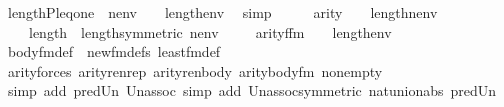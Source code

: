 \begin{isabellebody}
\ {\isachardoublequoteopen}length{\isacharparenleft}{\kern0pt}{\isacharbrackleft}{\kern0pt}P{\isacharcomma}{\kern0pt}leq{\isacharcomma}{\kern0pt}one{\isacharbrackright}{\kern0pt}\ {\isacharat}{\kern0pt}\ nenv{\isacharparenright}{\kern0pt}\ {\isacharequal}{\kern0pt}\ {}\ {\isacharhash}{\kern0pt}{\isacharplus}{\kern0pt}\ length{\isacharparenleft}{\kern0pt}env{\isacharparenright}{\kern0pt}{\isachardoublequoteclose}\ \isamarkupfalse%
\ simp\isanewline
\ \ \isamarkupfalse%
\ \isamarkupfalse%
\ {\isacartoucheopen}arity{\isacharparenleft}{\kern0pt}{\isacharunderscore}{\kern0pt}{\isacharparenright}{\kern0pt}\ {\isasymle}\ {}\ {\isacharhash}{\kern0pt}{\isacharplus}{\kern0pt}\ length{\isacharparenleft}{\kern0pt}nenv{\isacharparenright}{\kern0pt}{\isacartoucheclose}\isanewline
\ \ \ \ {\isacartoucheopen}length{\isacharparenleft}{\kern0pt}{\isacharunderscore}{\kern0pt}{\isacharparenright}{\kern0pt}\ {\isacharequal}{\kern0pt}\ length{\isacharparenleft}{\kern0pt}{\isacharunderscore}{\kern0pt}{\isacharparenright}{\kern0pt}{\isacartoucheclose}{\isacharbrackleft}{\kern0pt}symmetric{\isacharbrackright}{\kern0pt}\ {\isacartoucheopen}nenv{\isasymin}{\isacharunderscore}{\kern0pt}{\isacartoucheclose}\ {\isacartoucheopen}{\isasymphi}{\isasymin}{\isacharunderscore}{\kern0pt}{\isacartoucheclose}\isanewline
\ \ \isamarkupfalse%
\ {\isachardoublequoteopen}arity{\isacharparenleft}{\kern0pt}{\isacharquery}{\kern0pt}f{\isacharunderscore}{\kern0pt}fm{\isacharparenright}{\kern0pt}\ {\isasymle}\ {}\ {\isacharhash}{\kern0pt}{\isacharplus}{\kern0pt}\ length{\isacharparenleft}{\kern0pt}env{\isacharparenright}{\kern0pt}{\isachardoublequoteclose}\isanewline
\ \ \ \ \isamarkupfalse%
\ body{\isacharunderscore}{\kern0pt}fm{\isacharunderscore}{\kern0pt}def\ \ new{\isacharunderscore}{\kern0pt}fm{\isacharunderscore}{\kern0pt}defs\ least{\isacharunderscore}{\kern0pt}fm{\isacharunderscore}{\kern0pt}def\isanewline
\ \ \ \ \isamarkupfalse%
\ arity{\isacharunderscore}{\kern0pt}forces\ arity{\isacharunderscore}{\kern0pt}renrep\ arity{\isacharunderscore}{\kern0pt}renbody\ arity{\isacharunderscore}{\kern0pt}body{\isacharunderscore}{\kern0pt}fm{\isacharprime}{\kern0pt}\ nonempty\isanewline
\ \ \ \ \isamarkupfalse%
\ {\isacharparenleft}{\kern0pt}simp\ add{\isacharcolon}{\kern0pt}\ pred{\isacharunderscore}{\kern0pt}Un\ Un{\isacharunderscore}{\kern0pt}assoc{\isacharcomma}{\kern0pt}\ simp\ add{\isacharcolon}{\kern0pt}\ Un{\isacharunderscore}{\kern0pt}assoc{\isacharbrackleft}{\kern0pt}symmetric{\isacharbrackright}{\kern0pt}\ nat{\isacharunderscore}{\kern0pt}union{\isacharunderscore}{\kern0pt}abs{}\ pred{\isacharunderscore}{\kern0pt}Un{\isacharparenright}{\kern0pt}\isanewline

\end{isabellebody}
